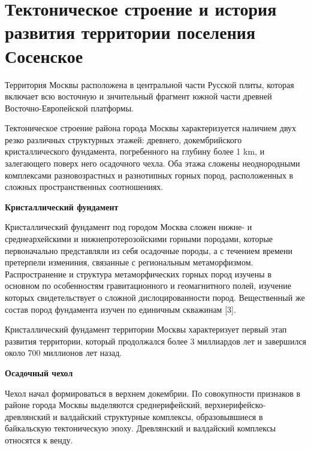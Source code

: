 \section{Тектоническое строение и история развития территории поселения Сосенское}\label{sec:ch2/sec2}

Территория Москвы расположена  в центральной части
Русской плиты, которая включает всю восточную и знчительный фрагмент южной части древней
Восточно-Европейской платформы. 

Тектоническое строение района города Москвы характеризуется наличием двух резко различных
структурных этажей: древнего, докембрийского кристаллического фундамента, погребенного 
на глубину более 1 \si{\kilo\meter}, и залегающего поверх него осадочного чехла.
Оба этажа сложены неоднородными комплексами разновозрастных и разнотипных горных пород, 
расположенных в сложных пространственных соотношениях.

\textbf{Кристаллический фундамент}

Кристаллический фундамент под городом Москва сложен нижне- и среднеархейскими и 
нижнепротерозойскими горными породами, которые первоначально представляли из себя 
осадочные породы, а с течением времени претерпели измениния, связанные с региональным 
метаморфизмом. Распространение и структура метаморфических горных пород изучены в 
основном по особенностям гравитационного и геомагнитного полей, изучение которых свидетельствует 
о сложной дислоцированности пород. Вещественный же состав пород фундамента изучен по 
единичным скважинам [3]. 

Кристаллический фундамент территории Москвы характеризует первый этап развития территории,
который продолжался более 3 миллиардов лет и завершился около 700 миллионов лет назад.

\textbf{Осадочный чехол}

Чехол начал формироваться в верхнем докембрии. По совокупности 
признаков в районе города Москвы выделяются среднерифейский, верхнерифейско-древлянский 
и валдайский структурные комплексы, образовывшиеся в байкальскую тектоническую эпоху. 
Древлянский и валдайский комплексы относятся к венду.

